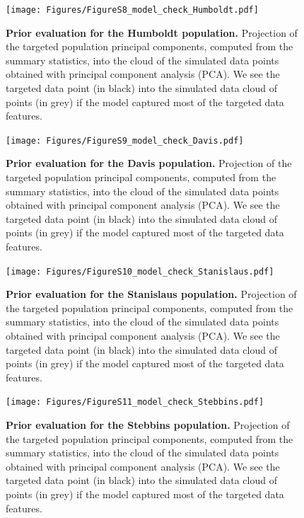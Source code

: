 \documentclass[a4paper, 12pt]{article}
\begin{document}
\begin{figure}[ht]
  \centering
  \texttt{[image: Figures/FigureS8\_model\_check\_Humboldt.pdf]}
  \small\caption{\textbf{Prior evaluation for the Humboldt population.} Projection of the targeted population principal components, computed from the summary statistics, into the cloud of the simulated data points obtained with principal component analysis (PCA). We see the targeted data point (in black) into the simulated data cloud of points (in grey) if the model captured most of the targeted data features.}
  \label{fig:supple_model_check_humboldt}
\end{figure}

\begin{figure}[ht]
  \centering
  \texttt{[image: Figures/FigureS9\_model\_check\_Davis.pdf]}
  \small\caption{\textbf{Prior evaluation for the Davis population.} Projection of the targeted population principal components, computed from the summary statistics, into the cloud of the simulated data points obtained with principal component analysis (PCA). We see the targeted data point (in black) into the simulated data cloud of points (in grey) if the model captured most of the targeted data features.}
  \label{fig:supple_model_check_davis}
\end{figure}

\begin{figure}[ht]
  \centering
  \texttt{[image: Figures/FigureS10\_model\_check\_Stanislaus.pdf]}
  \small\caption{\textbf{Prior evaluation for the Stanislaus population.} Projection of the targeted population principal components, computed from the summary statistics, into the cloud of the simulated data points obtained with principal component analysis (PCA). We see the targeted data point (in black) into the simulated data cloud of points (in grey) if the model captured most of the targeted data features.}
  \label{fig:supple_model_check_stanislaus}
\end{figure}

\begin{figure}[ht]
  \centering
  \texttt{[image: Figures/FigureS11\_model\_check\_Stebbins.pdf]}
  \small\caption{\textbf{Prior evaluation for the Stebbins population.} Projection of the targeted population principal components, computed from the summary statistics, into the cloud of the simulated data points obtained with principal component analysis (PCA). We see the targeted data point (in black) into the simulated data cloud of points (in grey) if the model captured most of the targeted data features.}
  \label{fig:supple_model_check_stebbins}
\end{figure}
\end{document}
